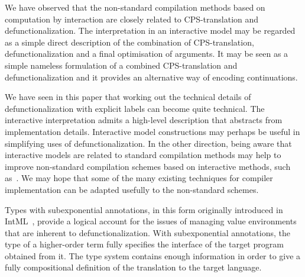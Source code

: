 \documentclass{LMCS}
\theoremstyle{definition}
\theoremstyle{plain}
\begin{document}
We have observed that the non-standard compilation methods based on
computation by interaction are closely related to CPS-translation and
defunctionalization.  The interpretation in an interactive model may
be regarded as a simple direct description of the combination of
CPS-translation, defunctionalization and a final optimisation of
arguments.  It may be seen as a 
simple nameless formulation of a combined CPS-translation and
defunctionalization and it provides an alternative way of encoding 
continuations.

We have seen in this paper that working out the
technical details of defunctionalization with explicit labels can
become quite technical. The interactive interpretation admits 
a high-level description that abstracts from implementation details.
Interactive model constructions may perhaps be
useful in simplifying uses of defunctionalization.
In the other direction,
being aware that interactive models are related to standard
compilation methods may help to improve non-standard compilation
schemes based on interactive methods, such as~\cite{Ghica07,intml}. We
may hope that some of the many existing techniques for compiler
implementation can be adapted usefully to the non-standard schemes.

Types with subexponential annotations, in this form originally introduced in IntML~\cite{intml}, 
provide a logical account for the issues of managing value
environments that are inherent to defunctionalization.
With subexponential annotations, the type of a higher-order term fully 
specifies the interface of the target program obtained from it.
The type system contains enough information in order to give a fully
compositional definition of the translation to the target language.
\end{document}
